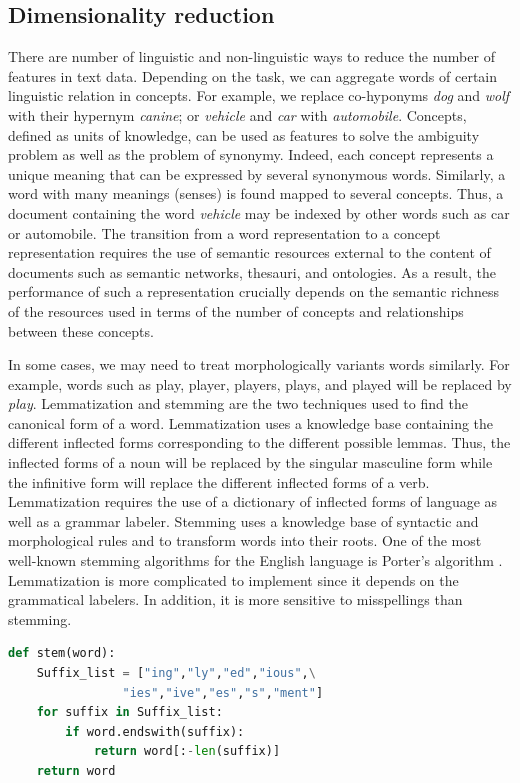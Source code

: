 \subsection{Dimensionality reduction}

There are number of linguistic and non-linguistic ways to reduce the number of features in text data. Depending on the task, we can aggregate words of certain linguistic relation in concepts. For example, we replace co-hyponyms \emph{dog} and \emph{wolf} with their hypernym \emph{canine}; or \emph{vehicle} and \emph{car} with \emph{automobile}. Concepts, defined as units of knowledge, can be used as features to solve the ambiguity problem as well as the problem of synonymy. Indeed, each concept represents a unique meaning that can be expressed by several synonymous words. Similarly, a word with many meanings (senses) is found mapped to several concepts. Thus, a document containing the word \emph{vehicle} may be indexed by other words such as car or automobile. The transition from a word representation to a concept representation requires the use of semantic resources external to the content of documents such as semantic networks, thesauri, and ontologies. As a result, the performance of such a representation crucially depends on the semantic richness of the resources used in terms of the number of concepts and relationships between these concepts. 

In some cases, we may need to treat morphologically variants words similarly. For example, words such as play, player, players, plays, and played will be replaced by \emph{play}. Lemmatization and stemming are the two techniques used to find the canonical form of a word. Lemmatization uses a knowledge base containing the different inflected forms corresponding to the different possible lemmas. Thus, the inflected forms of a noun will be replaced by the singular masculine form while the infinitive form will replace the different inflected forms of a verb. Lemmatization requires the use of a dictionary of inflected forms of language as well as a grammar labeler. Stemming uses a knowledge base of syntactic and morphological rules and to transform words into their roots. One of the most well-known stemming algorithms for the English language is Porter's algorithm \citep{porter1980algorithm}. Lemmatization is more complicated to implement since it depends on the grammatical labelers. In addition, it is more sensitive to misspellings than stemming.

\begin{lstlisting}[language=Python, caption=An example of simple Stemmer Written in Python]
def stem(word):
    Suffix_list = ["ing","ly","ed","ious",\
                "ies","ive","es","s","ment"]
    for suffix in Suffix_list:
        if word.endswith(suffix):
            return word[:-len(suffix)]
    return word
\end{lstlisting}


